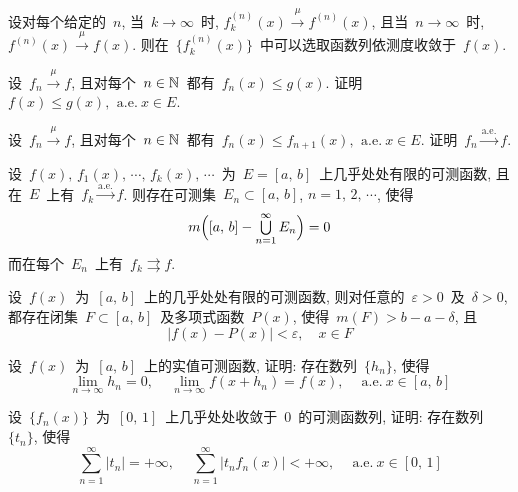 \begin{problemset}
\item 设对每个给定的~$n$, 当~$k \to \infty$~时, $f_k^{(n)}(x) \xrightarrow{~\mu~} f^{(n)}(x)$, 且当~$n \to \infty$~时, $f^{(n)}(x) \xrightarrow{~\mu~} f(x)$. 则在~$\big\{ f_k^{(n)}(x) \big\}$~中可以选取函数列依测度收敛于~$f(x)$.

\item 设~$f_n \xrightarrow{~\mu~} f$, 且对每个~$n \in \mathbb{N}$~都有~$f_n(x) \leqslant g(x)$. 证明~$f(x) \leqslant g(x), \, \mathrm{~a.e.~} x \in E$.

\item 设~$f_n \xrightarrow{~\mu~} f$, 且对每个~$n \in \mathbb{N}$~都有~$f_n(x) \leqslant f_{n+1}(x), \, \mathrm{~a.e.~} x \in E$. 证明~$f_n \xrightarrow{\mathrm{a.e.}} f$.

\item 设~$f(x),\,f_1(x),\,\cdots,\, f_k(x),\,\cdots$~为~$E=[a,\,b]$~上几乎处处有限的可测函数, 且在~$E$~上有~$f_k \xrightarrow{\mathrm{a.e.}} f$. 则存在可测集~$E_n \subset [a,\,b]$, $n=1,\,2,\,\cdots$, 使得
    \[
    m\Big( [a,\,b]-\mathop{\textstyle{\bigcup}}_{n=1}^\infty E_n \Big) = 0
    \]
    而在每个~$E_n$~上有~$f_k \rightrightarrows f$.

\item 设~$f(x)$~为~$[a,\,b]$~上的几乎处处有限的可测函数, 则对任意的~$\varepsilon > 0$~及~$\delta > 0$, 都存在闭集~$F \subset [a,\,b]$~及多项式函数~$P(x)$, 使得~$m(F) > b-a-\delta$, 且
    \[
    \big| f(x) - P(x) \big| < \varepsilon, \quad x \in F
    \]

\item 设~$f(x)$~为~$[a,\,b]$~上的实值可测函数, 证明: 存在数列~$\{h_n\}$, 使得
    \[
    \lim_{n \to \infty} h_n = 0, \, \quad \lim_{n \to \infty} f(x+h_n) = f(x), \quad \mathrm{~a.e.~} x \in [a,\,b]
    \]

\item 设~$\{f_n(x)\}$~为~$[0,\,1]$~上几乎处处收敛于~$0$~的可测函数列, 证明: 存在数列~$\{t_n\}$, 使得
\[
\sum_{n=1}^\infty |t_n| = +\infty, \, \quad \sum_{n=1}^\infty \big| t_n f_n(x) \big| < +\infty, \quad \mathrm{~a.e.~} x \in [0,\, 1]
\]
\end{problemset}


